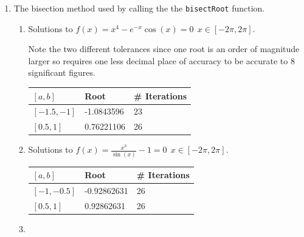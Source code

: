 \documentclass[a4paper,11pt]{article}
\begin{document}
\begin{enumerate}
	\item The bisection method used by calling the the \verb*|bisectRoot| 
	function.
	
	
	
	\begin{enumerate}
		\item Solutions to $f(x) = x^{4} - e^{-x} \cos(x) = 0 \  \ 
		x\in[-2\pi,2\pi]$.
		
		Note the two different tolerances since one root is an order of 
		magnitude larger so requires one less decimal place of accuracy to be 
		accurate to 8 significant figures.
		\begin{table}[!h]
			\centering
			\begin{tabular}{l|ll}
				$[a,b]$     & Root       & \# Iterations \\ \hline
				$[-1.5,-1]$ & -1.0843596 & 23           \\
				$[0.5,1]$   & 0.76221106 & 26          
			\end{tabular}
		\end{table}
	
	
		\item Solutions to $f(x) = \frac{x^{3}}{\sin(x)} - 1 = 0 \  \ 
		x\in[-2\pi,2\pi]$.
		
		\begin{table}[!h]
			\centering
			\begin{tabular}{l|ll}
				$[a,b]$     & Root        & \# Iterations \\ \hline
				$[-1,-0.5]$ & -0.92862631 & 26            \\
				$[0.5,1]$   & 0.92862631  & 26           
			\end{tabular}
		\end{table}
	
	
		\item
	\end{enumerate}
\end{enumerate}
\end{document}
